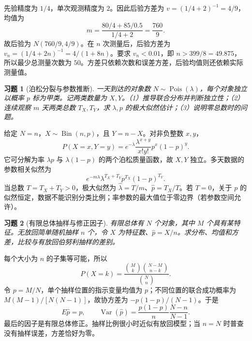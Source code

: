 \documentclass[12pt,fontset=fandol]{ctexart}
\newtheorem{exercise}{习题}[section]
\begin{document}
\begin{solve}\label{a:M-PF-31}先验精度为 $1/4$，单次观测精度为 $2$。因此后验方差为 $v=(1/4+2)^{-1}=4/9$，均值为\[m=\frac{80/4+85/0.5}{1/4+2}=\frac{760}{9}.\]故后验为 $N(760/9,4/9)$。在 $n$ 次测量后，后验方差为 $v_n=(1/4+2n)^{-1}=4/(1+8n)$。要求 $v_n<0.01$，即 $n>399/8=49.875$，所以最少总测量次数为 $50$。方差只依赖次数和误差方差，后验均值则还依赖实际测量值。\end{solve}

\begin{exercise}[泊松分裂与参数推断]\label{q:B17.1}
一天到达的对象数 $N\sim\operatorname{Pois}(\lambda)$，每个对象独立以概率 $p$ 标为甲类。记两类数量为 $X,Y$。（1）推导联合分布并判断独立性；（2）连续观察 $m$ 天两类总数 $T_X,T_Y$，求 $\lambda,p$ 的极大似然估计；（3）说明零总数时的问题。\par{}
\end{exercise}

\begin{solve}\label{a:B17.1}给定 $N=n$，$X\sim\operatorname{Bin}(n,p)$，且 $Y=n-X$。对非负整数 $x,y$，\[P(X=x,Y=y)=e^{-\lambda}\frac{\lambda^{x+y}}{x!y!}p^x(1-p)^y.\]它可分解为率 $\lambda p$ 与 $\lambda(1-p)$ 的两个泊松质量函数，故 $X,Y$ 独立。多天数据的参数相关似然为\[e^{-m\lambda}\lambda^{T_X+T_Y}p^{T_X}(1-p)^{T_Y}.\]当总数 $T=T_X+T_Y>0$，极大似然为 $\widehat\lambda=T/m$、$\widehat p=T_X/T$。若 $T=0$，关于 $p$ 的似然恒定，数据不能识别分类比例；率参数的最大值位于零边界（若参数空间允许）。\end{solve}

\begin{exercise}[有限总体抽样与修正因子]\label{q:B17.2}
有限总体有 $N$ 个对象，其中 $M$ 个具有某特征。无放回简单随机抽样 $n$ 个，令 $X$ 为特征数、$\widehat p=X/n$。求分布、均值和方差，比较与有放回伯努利抽样的差别。\par{}
\end{exercise}

\begin{solve}\label{a:B17.2}每个大小为 $n$ 的子集等可能，所以\[P(X=k)=\frac{\binom Mk\binom{N-M}{n-k}}{\binom Nn}.\]令 $p=M/N$，单个抽样位置的指示变量均值为 $p$；不同位置的联合成功概率为 $M(M-1)/[N(N-1)]$，故协方差为 $-p(1-p)/(N-1)$。于是\[E\widehat p=p,\qquad\operatorname{Var}(\widehat p)=\frac{p(1-p)}n\frac{N-n}{N-1}.\]最后的因子是有限总体修正。抽样比例很小时近似有放回模型；当 $n=N$ 时普查没有抽样误差，方差恰好为零。\end{solve}
\end{document}
